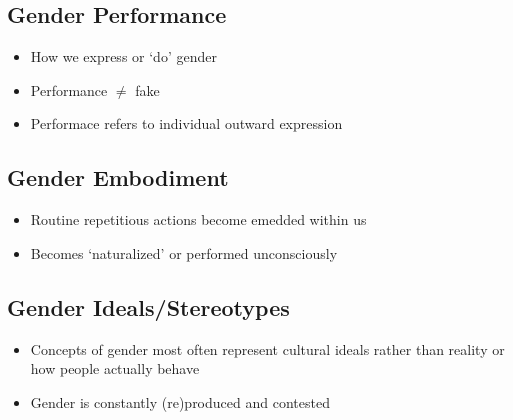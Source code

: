 \documentclass{article}
\begin{document}
\subsection{Gender Performance}
\begin{itemize}
  \item How we express or `do' gender
  \item Performance $ \neq $ fake
  \item Performace refers to individual outward expression
\end{itemize}

\subsection{Gender Embodiment}
\begin{itemize}
  \item Routine repetitious actions become emedded within us
  \item Becomes `naturalized' or performed unconsciously
\end{itemize}

\subsection{Gender Ideals/Stereotypes}
\begin{itemize}
  \item Concepts of gender most often represent cultural ideals rather than reality or how people actually behave
  \item Gender is constantly (re)produced and contested
\end{itemize}
\end{document}
